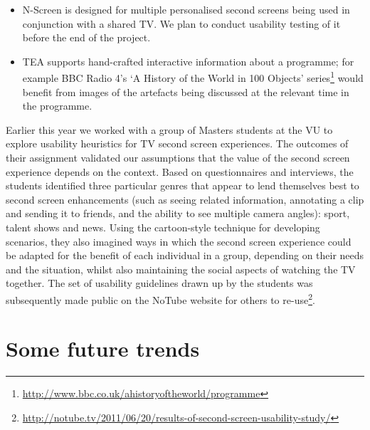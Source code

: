 \documentclass{notube}
\begin{document}
\begin{itemize}
\item{N-Screen is designed for multiple personalised second screens being used in conjunction with a shared TV. We plan to conduct usability testing of it before the end of the project.}
\item{TEA supports hand-crafted interactive information about a programme; for example BBC Radio 4's `A History of the World in 100 Objects' series\footnote{\url{http://www.bbc.co.uk/ahistoryoftheworld/programme}} would benefit from images of the artefacts being discussed at the relevant time in the programme.}
\end{itemize}

Earlier this year we worked with a group of Masters students at the VU to explore usability heuristics for TV second screen experiences. The outcomes of their assignment validated our assumptions that the value of the second screen experience depends on the context. Based on questionnaires and interviews, the students identified three particular genres that appear to lend themselves best to second screen enhancements (such as seeing related information, annotating a clip and sending it to friends, and the ability to see multiple camera angles): sport, talent shows and news. Using the cartoon-style technique for developing scenarios, they also imagined ways in which the second screen experience could be adapted for the benefit of each individual in a group, depending on their needs and the situation, whilst also maintaining the social aspects of watching the TV together. The set of usability guidelines drawn up by the students was subsequently made public on the NoTube website for others to re-use\footnote{\url{http://notube.tv/2011/06/20/results-of-second-screen-usability-study/}}.

\section{Some future trends}
\end{document}
